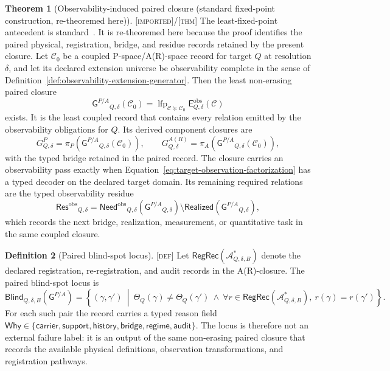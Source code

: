 \documentclass[11pt]{article}
\newcommand{\GPair}{\ensuremath{\mathsf{G}^{P/A}}}
\newcommand{\ObsNeed}{\ensuremath{\mathsf{Need}^{\mathrm{obs}}}}
\newcommand{\ObsRes}{\ensuremath{\mathsf{Res}^{\mathrm{obs}}}}
\newcommand{\Defn}{\textsc{[def]}}
\newcommand{\Thm}{\textsc{[thm]}}
\newcommand{\Imp}{\textsc{[imported]}}
\theoremstyle{definition}
\newtheorem{sdefinition}{Definition}
\newtheorem{stheorem}[sdefinition]{Theorem}
\begin{document}
\begin{stheorem}[Observability-induced paired closure (standard fixed-point construction, re-theoremed here)]
\label{thm:observability-induced-paired-closure}
\Imp{}/\Thm{} The least-fixed-point antecedent is standard~\cite{S_Tarski1955}.
It is re-theoremed here because the proof identifies the paired physical,
registration, bridge, and residue records retained by the present closure. Let
$\mathcal C_0$ be a coupled P-space/A(R)-space record for target $Q$ at resolution
$\delta$, and let its declared extension universe be observability complete in the
sense of Definition~\ref{def:observability-extension-generator}.
Then the least non-erasing paired closure
\begin{equation}
\GPair_{Q,\delta}(\mathcal C_0)=
\operatorname{lfp}_{\mathcal C\succeq\mathcal C_0}
\mathsf E^{\mathrm{obs}}_{Q,\delta}(\mathcal C)
\label{eq:observability-induced-paired-closure}
\end{equation}
exists. It is the least coupled record that contains every relation emitted by the
observability obligations for $Q$. Its derived component closures are
\begin{equation}
G^P_{Q,\delta}=\pi_P\!\left(\GPair_{Q,\delta}(\mathcal C_0)\right),
\qquad
G^{A(R)}_{Q,\delta}=\pi_A\!\left(\GPair_{Q,\delta}(\mathcal C_0)\right),
\label{eq:derived-component-g-closures}
\end{equation}
with the typed bridge retained in the paired record. The closure carries an
observability pass exactly when Equation~\eqref{eq:target-observation-factorization}
has a typed decoder on the declared target domain. Its remaining required
relations are the typed observability residue
\begin{equation}
\ObsRes_{Q,\delta}=
\ObsNeed_{Q,\delta}\!\left(\GPair_{Q,\delta}\right)
\setminus
\mathsf{Realized}\!\left(\GPair_{Q,\delta}\right),
\label{eq:observability-residue}
\end{equation}
which records the next bridge, realization, measurement, or quantitative task in
the same coupled closure.
\end{stheorem}

\begin{sdefinition}[Paired blind-spot locus]
\label{def:paired-blind-spot-locus}
\Defn{} Let $\mathsf{RegRec}(\mathcal A^{\ast}_{Q,\delta,B})$ denote the declared
registration, re-registration, and audit records in the A(R)-closure. The paired
blind-spot locus is
\begin{equation}
\mathsf{Blind}_{Q,\delta,B}(\GPair)=
\left\{(\gamma,\gamma')\ \middle|\ 
\Theta_Q(\gamma)\neq\Theta_Q(\gamma')\ \land\
\forall r\in\mathsf{RegRec}(\mathcal A^{\ast}_{Q,\delta,B}),\ r(\gamma)=r(\gamma')
\right\}.
\label{eq:paired-blind-spot-locus}
\end{equation}
For each such pair the record carries a typed reason field
$\mathsf{Why}\in\{\mathsf{carrier},\mathsf{support},\mathsf{history},
\mathsf{bridge},\mathsf{regime},\mathsf{audit}\}$. The locus is therefore not an
external failure label: it is an output of the same non-erasing paired closure that
records the available physical definitions, observation transformations, and
registration pathways.
\end{sdefinition}
\end{document}
